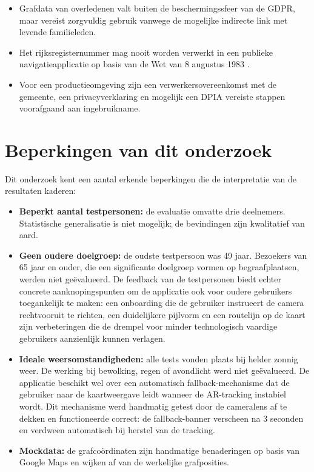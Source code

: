\begin{itemize}
    \item Grafdata van overledenen valt buiten de beschermingssfeer van de GDPR,
    maar vereist zorgvuldig gebruik vanwege de mogelijke indirecte link met
    levende familieleden.
    \item Het rijksregisternummer mag nooit worden verwerkt in een
    publieke navigatieapplicatie op basis van de Wet van 8 augustus 1983
    \autocite{WetRijksregister1983}.
    \item Voor een productieomgeving zijn een verwerkersovereenkomst met de
    gemeente, een privacyverklaring en mogelijk een DPIA vereiste stappen
    voorafgaand aan ingebruikname.
\end{itemize}

\section{Beperkingen van dit onderzoek}

Dit onderzoek kent een aantal erkende beperkingen die de interpretatie van de
resultaten kaderen:

\begin{itemize}
    \item \textbf{Beperkt aantal testpersonen:} de evaluatie omvatte drie
    deelnemers. Statistische generalisatie is niet mogelijk; de bevindingen
    zijn kwalitatief van aard. 
    
    \item \textbf{Geen oudere doelgroep:} de oudste testpersoon was 49 jaar.
    Bezoekers van 65 jaar en ouder, die een significante doelgroep vormen op
    begraafplaatsen, werden niet geëvalueerd. De feedback van de testpersonen
    biedt echter concrete aanknopingspunten om de applicatie ook voor oudere
    gebruikers toegankelijk te maken: een onboarding die de gebruiker instrueert
    de camera rechtvooruit te richten, een duidelijkere pijlvorm en een
    routelijn op de kaart zijn verbeteringen die de drempel voor minder
    technologisch vaardige gebruikers aanzienlijk kunnen verlagen.
    
    \item \textbf{Ideale weersomstandigheden:} alle tests vonden plaats bij
    helder zonnig weer. De werking bij bewolking, regen of avondlicht werd
    niet geëvalueerd. De applicatie beschikt wel over een automatisch
    fallback-mechanisme dat de gebruiker naar de kaartweergave leidt wanneer
    de AR-tracking instabiel wordt. Dit mechanisme werd handmatig getest door
    de cameralens af te dekken en functioneerde correct: de fallback-banner
    verscheen na 3 seconden en verdween automatisch bij herstel van de tracking.
    
    \item \textbf{Mockdata:} de grafcoördinaten zijn handmatige benaderingen
    op basis van Google Maps en wijken af van de werkelijke grafposities.
\end{itemize}

